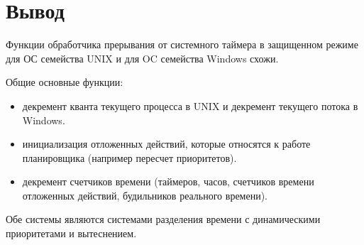 \chapter*{Вывод}
Функции обработчика прерывания от системного таймера в защищенном режиме для ОС семейства UNIX и для OC семейства Windows схожи. 

Общие основные функции:
\begin{itemize}
	\item декремент кванта текущего процесса в UNIX и декремент текущего потока в Windows.
	\item инициализация отложенных действий, которые относятся к работе планировщика (например пересчет приоритетов).
	\item декремент счетчиков времени (таймеров, часов, счетчиков времени отложенных действий, будильников реального времени).
\end{itemize}

Обе системы являются системами разделения времени с динамическими приоритетами и вытеснением.